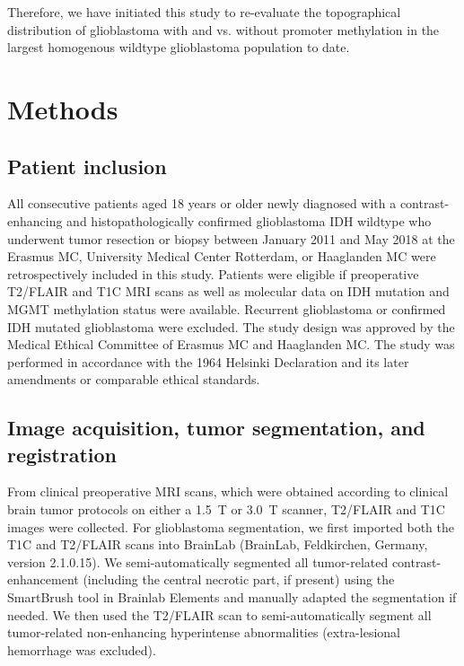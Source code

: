 Therefore, we have initiated this study to re-evaluate the topographical distribution of glioblastoma with and vs. without  promoter methylation in the largest homogenous  wildtype glioblastoma population to date.

\section{Methods}
\subsection{Patient inclusion}

All consecutive patients aged 18 years or older newly diagnosed with a contrast-enhancing and histopathologically confirmed glioblastoma \gls{IDH} wildtype who underwent \gls{tumor} resection or biopsy between January 2011 and May 2018 at the Erasmus MC, University Medical Center Rotterdam, or Haaglanden MC were retrospectively included in this study.
Patients were eligible if preoperative \gls{T2}/\gls{FLAIR} and \gls{T1C} \gls{MRI} scans as well as molecular data on \gls{IDH} mutation and \gls{MGMT} methylation status were available.
Recurrent glioblastoma or confirmed \gls{IDH} mutated glioblastoma were excluded.
The study design was approved by the Medical Ethical Committee of Erasmus MC and Haaglanden MC.
The study was performed in accordance with the 1964 Helsinki Declaration and its later amendments or comparable ethical standards.

\subsection{Image acquisition, \gls{tumor} segmentation, and registration}
From clinical preoperative \gls{MRI} scans, which were obtained according to clinical brain \gls{tumor} protocols on either a \SI{1.5}{\tesla} or \SI{3.0}{\tesla} scanner, \gls{T2}/\gls{FLAIR} and \gls{T1C} images were collected.
For glioblastoma segmentation, we first imported both the \gls{T1C} and \gls{T2}/\gls{FLAIR} scans into BrainLab (BrainLab, Feldkirchen, Germany, version 2.1.0.15).
We semi-automatically segmented all \gls{tumor}-related contrast-enhancement (including the central necrotic part, if present) using the SmartBrush tool in Brainlab Elements and manually adapted the segmentation if needed.
We then used the \gls{T2}/\gls{FLAIR} scan to semi-automatically segment all \gls{tumor}-related non-enhancing hyperintense abnormalities (extra-lesional hemorrhage was excluded).

